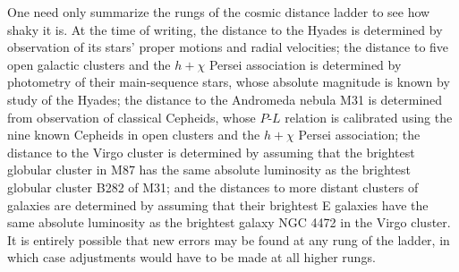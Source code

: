 One need only summarize the rungs of the cosmic distance ladder to see how
shaky it is. At the time of writing, the distance to the Hyades is determined
by observation of its stars' proper motions and radial velocities; the
distance to five open galactic clusters and the \(h+\chi\) Persei
association is determined by photometry of their main-sequence stars, whose
absolute magnitude is known by study of the Hyades; the distance to the
Andromeda nebula M31 is determined from observation of classical Cepheids,
whose \(P\)-\(L\) relation is calibrated using the nine known Cepheids in
open clusters and the \(h+\chi\) Persei association; the distance to the
Virgo cluster is determined by assuming that the brightest globular cluster
in M87 has the same absolute luminosity as the brightest globular cluster
B282 of M31; and the distances to more distant clusters of galaxies are
determined by assuming that their brightest E galaxies have the same
absolute luminosity as the brightest galaxy NGC 4472 in the Virgo cluster.
It is entirely possible that new errors may be found at any rung of the
ladder, in which case adjustments would have to be made at all higher rungs.
